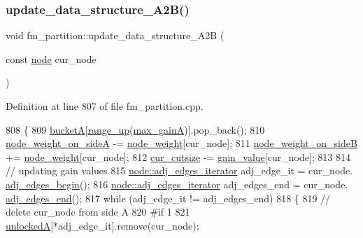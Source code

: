 \subsubsection{\texorpdfstring{update\+\_\+data\+\_\+structure\+\_\+\+A2\+B()}{update\_data\_structure\_A2B()}}
{\footnotesize\ttfamily void fm\+\_\+partition\+::update\+\_\+data\+\_\+structure\+\_\+\+A2B (\begin{DoxyParamCaption}\item[{const \mbox{\hyperlink{classnode}{node}}}]{cur\+\_\+node }\end{DoxyParamCaption})\hspace{0.3cm}{\ttfamily [protected]}}



Definition at line 807 of file fm\+\_\+partition.\+cpp.


\begin{DoxyCode}
808 \{
809     \mbox{\hyperlink{classfm__partition_a399955e0c84bad93cb82b5ffe8cf4a04}{bucketA}}[\mbox{\hyperlink{classfm__partition_ac49d477ecbf512fa375b76a472ec54f8}{range\_up}}(\mbox{\hyperlink{classfm__partition_a6c6a7a05bebe943e681329d30bb13339}{max\_gainA}})].pop\_back();
810     \mbox{\hyperlink{classfm__partition_a8a50d15b399c9ed35d6987c8fb68aa2b}{node\_weight\_on\_sideA}} -= \mbox{\hyperlink{classfm__partition_ae1ba643b4bd6721075ab7b608bcf3cd6}{node\_weight}}[cur\_node];
811     \mbox{\hyperlink{classfm__partition_a6dc967e385b31096a85f17c51f1f0824}{node\_weight\_on\_sideB}} += \mbox{\hyperlink{classfm__partition_ae1ba643b4bd6721075ab7b608bcf3cd6}{node\_weight}}[cur\_node];
812     \mbox{\hyperlink{classfm__partition_abc8f24c354d2a15f8ec8ef9a46252c93}{cur\_cutsize}} -= \mbox{\hyperlink{classfm__partition_ae8176f4ce82305abfd58e519d2cdd91d}{gain\_value}}[cur\_node];
813     
814     \textcolor{comment}{// updating gain values}
815     \mbox{\hyperlink{classnode_a12cb1a2167f5f03c054de5e707d3156f}{node::adj\_edges\_iterator}} adj\_edge\_it = cur\_node.
      \mbox{\hyperlink{classnode_a788d3e932a5c164caa5ec82aa47551b2}{adj\_edges\_begin}}();
816     \mbox{\hyperlink{classnode_a12cb1a2167f5f03c054de5e707d3156f}{node::adj\_edges\_iterator}} adj\_edges\_end = cur\_node.
      \mbox{\hyperlink{classnode_aa1e7887d29390297580769454f769ad6}{adj\_edges\_end}}();
817     \textcolor{keywordflow}{while} (adj\_edge\_it != adj\_edges\_end)
818     \{
819     \textcolor{comment}{// delete cur\_node from side A}
820 \textcolor{preprocessor}{#if 1}
821         \mbox{\hyperlink{classfm__partition_a9d75a1d63f711a0c66ae7f5bc181cd8b}{unlockedA}}[*adj\_edge\_it].remove(cur\_node);

\end{DoxyCode}
